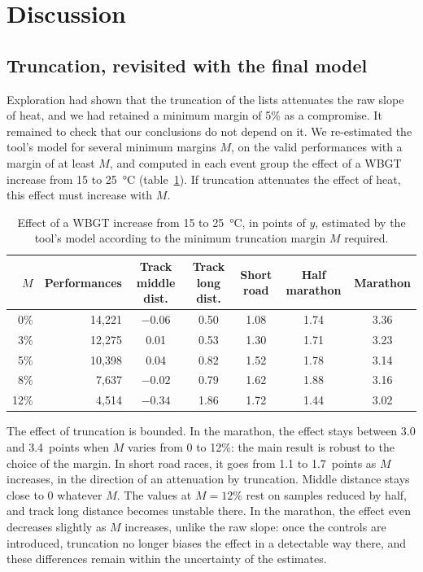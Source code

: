 \documentclass[11pt,a4paper]{article}
\begin{document}
\section{Discussion}\label{sec:discussion}

\subsection{Truncation, revisited with the final model}\label{sec:sensitivity}

Exploration had shown that the truncation of the lists attenuates the raw slope of heat, and we had retained a minimum
margin of 5\% as a compromise. It remained to check that our conclusions do not depend on it. We re-estimated the
tool's model for several minimum margins $M$, on the valid performances with a margin of at least $M$, and computed in
each event group the effect of a WBGT increase from 15 to 25~°C (table~\ref{tab:margins}). If truncation attenuates the
effect of heat, this effect must increase with $M$.

\begin{table}[htbp]
\centering
\small
\caption{Effect of a WBGT increase from 15 to 25~°C, in points of $y$, estimated by the tool's model according to the
minimum truncation margin $M$ required.}
\label{tab:margins}
\begin{tabular}{@{}rrccccc@{}}
\toprule
$M$ & Performances & Track middle dist. & Track long dist. & Short road & Half marathon & Marathon \\
\midrule
0\% & 14,221 & $-0.06$ & 0.50 & 1.08 & 1.74 & 3.36 \\
3\% & 12,275 & 0.01 & 0.53 & 1.30 & 1.71 & 3.23 \\
5\% & 10,398 & 0.04 & 0.82 & 1.52 & 1.78 & 3.14 \\
8\% & 7,637 & $-0.02$ & 0.79 & 1.62 & 1.88 & 3.16 \\
12\% & 4,514 & $-0.34$ & 1.86 & 1.72 & 1.44 & 3.02 \\
\bottomrule
\end{tabular}
\end{table}

The effect of truncation is bounded. In the marathon, the effect stays between 3.0 and 3.4~points when $M$ varies from
0 to 12\%: the main result is robust to the choice of the margin. In short road races, it goes from 1.1 to 1.7~points as
$M$ increases, in the direction of an attenuation by truncation. Middle distance stays close to 0 whatever $M$. The
values at $M = 12$\% rest on samples reduced by half, and track long distance becomes unstable there. In the marathon,
the effect even decreases slightly as $M$ increases, unlike the raw slope: once the controls are introduced, truncation
no longer biases the effect in a detectable way there, and these differences remain within the uncertainty of the
estimates.
\end{document}
